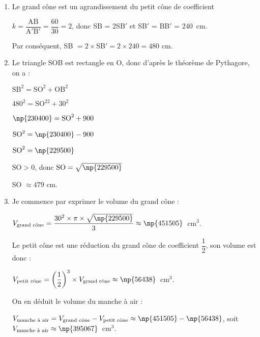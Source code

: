
\medskip

\begin{enumerate}
\item Le grand cône est un agrandissement du petit cône de coefficient 

$k = \dfrac{\text{AB}}{\text{A}'\text{B}'} = \dfrac{60}{30} = 2$, donc SB = 2SB$'$ et SB$'$ = BB$'$ = 240~cm.

Par conséquent, SB $= 2 \times $SB$' = 2 \times 240 = 480$ cm.
\item  Le triangle SOB est rectangle en O, donc d'après le théorème de Pythagore, on a :

$\text{SB}^2 = \text{SO}^2 + \text{OB}^2$

$480^2 = \text{SO}^22 + 30^2$

$\np{230400} = \text{SO}^2 + 900$

$\text{SO}^2 = \np{230400} - 900$

$\text{SO}^2 = \np{229500}$

$\text{SO} > 0$, donc $\text{SO} = \sqrt{\np{229500}}$

SO $\approx 479$ cm.
\item  Je commence par exprimer le volume du grand cône :

$V_{\text{grand cône}} = \dfrac{30^2 \times  \pi \times \sqrt{\np{229500}}}{3} \approx  \np{451505}$~cm$^3$.

Le petit cône est une réduction du grand cône de coefficient $\dfrac{1}{2}$, son volume est donc :

$V_{\text{petit cône}} = \left(\dfrac{1}{2}\right)^3 \times  V_{\text{grand cône}} \approx \np{56438}$~cm$^3$.

On en déduit le volume du manche à air :

$V_{\text{manche à air}} = V_{\text{grand cône}} - V_{\text{petit cône}} \approx 
\np{451505} - \np{56438}$, soit $V_{\text{manche à air}} \approx \np{395067}$~cm$^3$.
\end{enumerate}

\vspace{0,5cm}


